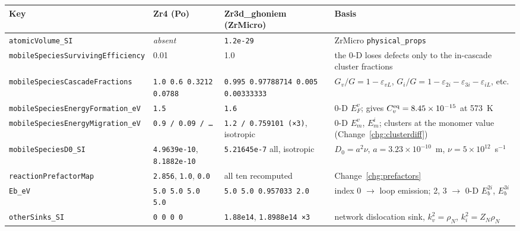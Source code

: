 \documentclass[11pt,a4paper]{article}
\newcommand{\code}[1]{\texttt{\small #1}}
\newcounter{chg}
\begin{document}
\begin{center}
\small
\begin{tabular}{@{}p{4.1cm}p{2.2cm}p{3.0cm}p{5.2cm}@{}}
\toprule
Key & Zr4 (Po) & Zr3d\_ghoniem (ZrMicro) & Basis \\
\midrule
\code{atomicVolume\_SI} & \emph{absent} & \code{1.2e-29} & ZrMicro \code{physical\_props\allowbreak['Omega']} \\
\code{mobileSpecies\allowbreak SurvivingEfficiency} & 0.01 & 1.0 & the 0-D loses defects only to the in-cascade cluster fractions \\
\code{mobileSpecies\allowbreak CascadeFractions} & \code{1.0 0.6 0.3212 0.0788} & \code{0.995 0.97788714 0.005 0.00333333} & $G_v/G = 1-\varepsilon_{vL}$, $G_i/G = 1-\varepsilon_{2i}-\varepsilon_{3i}-\varepsilon_{iL}$, etc. \\
\code{mobileSpecies\allowbreak EnergyFormation\_eV} & \code{1.5} & \code{1.6} & 0-D $E_F^v$; gives $C_v^{\rm eq} = 8.45\times10^{-15}$ at 573~K \\
\code{mobileSpecies\allowbreak EnergyMigration\_eV} & \code{0.9 / 0.09 / …} & \code{1.2 / 0.759101 (×3)}, isotropic & 0-D $E_m^v$, $E_m^i$; clusters at the monomer value (Change~\ref{chg:clusterdiff}) \\
\code{mobileSpecies\allowbreak D0\_SI} & \code{4.9639e-10}, \code{8.1882e-10} & \code{5.21645e-7} all, isotropic & $D_0 = a^2\nu$, $a = 3.23\times10^{-10}$~m, $\nu = 5\times10^{12}$~s$^{-1}$ \\
\code{reactionPrefactorMap} & \code{2.856}, \code{1.0}, \code{0.0} & all ten recomputed & Change~\ref{chg:prefactors} \\
\code{Eb\_eV} & \code{5.0 5.0 5.0 5.0} & \code{5.0 5.0 0.957033 2.0} & index 0 $\rightarrow$ loop emission; 2, 3 $\rightarrow$ 0-D $E_b^{2i}$, $E_b^{3i}$ \\
\code{otherSinks\_SI} & \code{0 0 0 0} & \code{1.88e14}, \code{1.8988e14 ×3} & network dislocation sink, $k^2_v = \rho_N$, $k^2_i = Z_N\rho_N$ \\
\bottomrule
\end{tabular}
\end{center}
\end{document}
